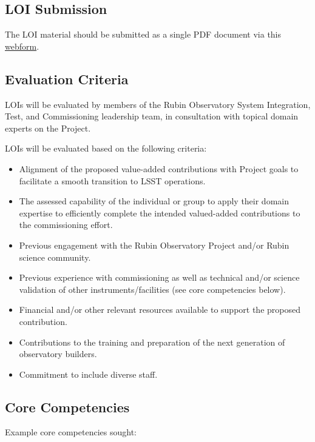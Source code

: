 \documentclass[SE,authoryear,toc]{lsstdoc}
\begin{document}
\subsection{LOI Submission}

The LOI material should be submitted as a single PDF document via this \href{https://forms.gle/K6pKZDbS19gqhG2H6}{webform}.

\subsection{Evaluation Criteria}

LOIs will be evaluated by members of the Rubin Observatory System Integration, Test, and Commissioning leadership team, in consultation with topical domain experts on the Project.

LOIs will be evaluated based on the following criteria:
\begin{itemize}
\item Alignment of the proposed value-added contributions with Project goals to facilitate a smooth transition to LSST operations.
\item The assessed capability of the individual or group to apply their domain expertise to efficiently complete the intended valued-added contributions to the commissioning effort.
\item Previous engagement with the Rubin Observatory Project and/or Rubin science community.
\item Previous experience with commissioning as well as technical and/or science validation of other instruments/facilities (see core competencies below).
\item Financial and/or other relevant resources available to support the proposed contribution.
\item Contributions to the training and preparation of the next generation of observatory builders.
\item Commitment to include diverse staff.
\end{itemize}

\subsection{Core Competencies}

Example core competencies sought:
\end{document}
